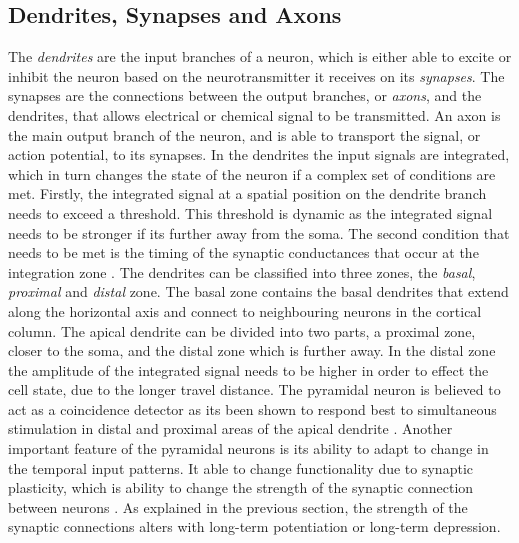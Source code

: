 \subsection{Dendrites, Synapses and Axons}
The \textit{dendrites} are the input branches of a neuron, which is either able to excite or inhibit the neuron based on the neurotransmitter it receives on its \textit{synapses}. The synapses are the connections between the output branches, or \textit{axons}, and the dendrites, that allows electrical or chemical signal to be transmitted. An axon is the main output branch of the neuron, and is able to transport the signal, or action potential, to its synapses. In the dendrites the input signals are integrated, which in turn changes the state of the neuron if a complex set of conditions are met. Firstly, the integrated signal at a spatial position on the dendrite branch needs to exceed a threshold. This threshold is dynamic as the integrated signal needs to be stronger if its further away from the soma. The second condition that needs to be met is the timing of the synaptic conductances that occur at the integration zone \cite{PyramidalNeuron}. The dendrites can be classified into three zones, the \textit{basal}, \textit{proximal} and \textit{distal} zone. The basal zone contains the basal dendrites that extend along the horizontal axis and connect to neighbouring neurons in the cortical column. The apical dendrite can be divided into two parts, a proximal zone, closer to the soma, and the distal zone which is further away. In the distal zone the amplitude of the integrated signal needs to be higher in order to effect the cell state, due to the longer travel distance. The pyramidal neuron is believed to act as a coincidence detector as its been shown to respond best to simultaneous stimulation in distal and proximal areas of the apical dendrite \cite{PyramidalNeuron}. Another important feature of the pyramidal neurons is its ability to adapt to change in the temporal input patterns. It able to change functionality due to synaptic plasticity, which is ability to change the strength of the synaptic connection between neurons \cite{PyramidalNeuron}. As explained in the previous section, the strength of the synaptic connections alters with long-term potentiation or long-term depression.